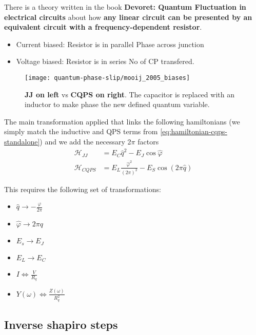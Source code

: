 There  is  a  theory  written   in  the  book  \textbf{Devoret:  Quantum
  Fluctuation  in  electrical  circuits} about  how  \textbf{any  linear
  circuit   can  be   presented  by   an  equivalent   circuit  with   a
  frequency-dependent resistor}.

\begin{itemize}
\item  Current  biased: Resistor  is  in  parallel \hfill  Phase  across
  junction
\item Voltage biased: Resistor is in series \hfill No of CP transfered.
\end{itemize}

\begin{figure}[h]
  \centering
  \texttt{[image: quantum-phase-slip/mooij\_2005\_biases]}
  \caption{\small  \textbf{JJ on  left} vs  \textbf{CQPS on  right}. The
    capacitor is replaced with an inductor to make phase the new defined
    quantum variable. \label{fig:mooij_2005_biases}}
\end{figure}

The main  transformation applied  that links the  following hamiltonians
(we    simply    match    the    inductive   and    QPS    terms    from
\autoref{eq:hamiltonian-cqps-standalone})  and  we   add  the  necessary
2$\pi$ factors
\begin{equation}
  \begin{aligned}
    \mathcal{H}_{JJ} & = E_C\hat{q}^2 - E_J\cos\hat{\varphi} \\
    \mathcal{H}_{CQPS}   &  =   E_L\frac{\hat{\varphi}^2}{(2\pi)^{2}}  -
    E_S\cos(2\pi\hat{q})
  \end{aligned}
\end{equation}

\noindent This requires the following set of transformations:

\begin{itemize}
\item $\hat{q} \rightarrow - \frac{\varphi}{2\pi}$
\item $\hat{\varphi} \rightarrow 2\pi q$
\item $E_s \rightarrow E_J$
\item $E_L \rightarrow E_C$
\item $I \Leftrightarrow \frac{V}{R_{q}}$
\item $Y(\omega) \Leftrightarrow \frac{Z(\omega)}{R_q^2}$
\end{itemize}

\subsection{Inverse shapiro steps}
\label{sec:inverse-shap-steps}

